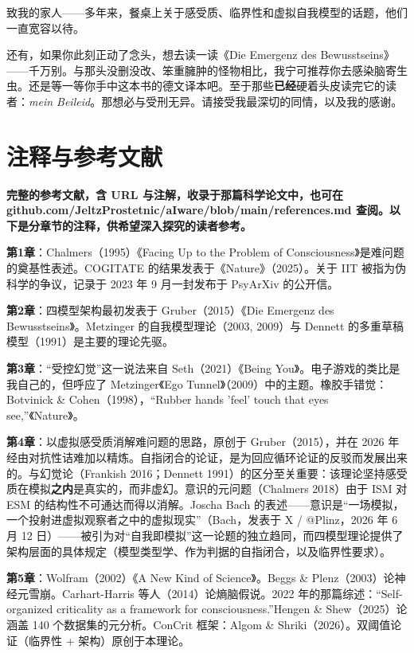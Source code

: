 \documentclass[11pt, twoside, openright]{book}
\begin{document}
致我的家人------多年来，餐桌上关于感受质、临界性和虚拟自我模型的话题，他们一直宽容以待。

还有，如果你此刻正动了念头，想去读一读《Die Emergenz des Bewusstseins》------千万别。与那头没删没改、笨重臃肿的怪物相比，我宁可推荐你去感染脑寄生虫。还是等一等你手中这本书的德文译本吧。至于那些\textbf{已经}硬着头皮读完它的读者：\textit{mein Beileid}。那想必与受刑无异。请接受我最深切的同情，以及我的感谢。


\chapter*{注释与参考文献}

\textbf{完整的参考文献，含 URL 与注解，收录于那篇科学论文中，也可在 github.com/JeltzProstetnic/aIware/blob/main/references.md 查阅。以下是分章节的注释，供希望深入探究的读者参考。}

\textbf{第1章}：Chalmers（1995）《Facing Up to the Problem of Consciousness》是难问题的奠基性表述。COGITATE 的结果发表于《Nature》（2025）。关于 IIT 被指为伪科学的争议，记录于 2023 年 9 月一封发布于 PsyArXiv 的公开信。

\textbf{第2章}：四模型架构最初发表于 Gruber（2015）《Die Emergenz des Bewusstseins》。Metzinger 的自我模型理论（2003, 2009）与 Dennett 的多重草稿模型（1991）是主要的理论先驱。

\textbf{第3章}：“受控幻觉”这一说法来自 Seth（2021）《Being You》。电子游戏的类比是我自己的，但呼应了 Metzinger《Ego Tunnel》（2009）中的主题。橡胶手错觉：Botvinick \& Cohen（1998），“Rubber hands 'feel' touch that eyes see,”《Nature》。

\textbf{第4章}：以虚拟感受质消解难问题的思路，原创于 Gruber（2015），并在 2026 年经由对抗性诘难加以精炼。自指闭合的论证，是为回应循环论证的反驳而发展出来的。与幻觉论（Frankish 2016；Dennett 1991）的区分至关重要：该理论坚持感受质在模拟\textbf{之内}是真实的，而非虚幻。意识的元问题（Chalmers 2018）由于 ISM 对 ESM 的结构性不可通达而得以消解。Joscha Bach 的表述------意识是“一场模拟，一个投射进虚拟观察者之中的虚拟现实”（Bach，发表于 X / @Plinz，2026 年 6 月 12 日）------被引为对“自我即模拟”这一论题的独立趋同，而四模型理论提供了架构层面的具体规定（模型类型学、作为判据的自指闭合，以及临界性要求）。

\textbf{第5章}：Wolfram（2002）《A New Kind of Science》。Beggs \& Plenz（2003）论神经元雪崩。Carhart-Harris 等人（2014）论熵脑假说。2022 年的那篇综述：“Self-organized criticality as a framework for consciousness.”Hengen \& Shew（2025）论涵盖 140 个数据集的元分析。ConCrit 框架：Algom \& Shriki（2026）。双阈值论证（临界性 + 架构）原创于本理论。
\end{document}
